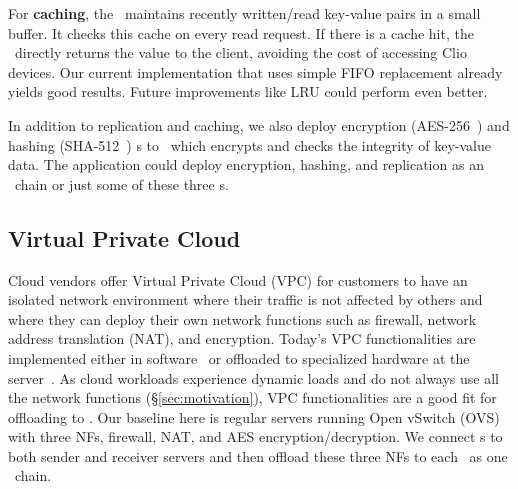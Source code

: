 For \textbf{caching}, the \snic\ maintains recently written/read key-value pairs in a small buffer. It checks this cache on every read request. If there is a cache hit, the \snic\ directly returns the value to the client, avoiding the cost of accessing Clio devices. Our current implementation that uses simple FIFO replacement already yields good results. Future improvements like LRU could perform even better.

In addition to replication and caching, we also deploy encryption (AES-256~\cite{aes-wiki}) and hashing (SHA-512~\cite{sha-wiki}) \nt{}s to \snic\ which encrypts and checks the integrity of key-value data.
The application could deploy encryption, hashing, and replication as an \nt\ chain or just some of these three \nt{}s.
\fi

\subsection{Virtual Private Cloud}
\label{sec:vpc}

Cloud vendors offer Virtual Private Cloud (VPC) for customers to have an isolated network environment where their traffic is not affected by others and where they can deploy their own network functions such as firewall, network address translation (NAT), and encryption.
Today's VPC functionalities are implemented either in software~\cite{andromeda-google-nsdi18,ovs-nsdi15,ovs-sigcomm21} or offloaded to specialized hardware at the server~\cite{vfp-nsdi17,SmartNIC-nsdi18,aws-nitro}.
As cloud workloads experience dynamic loads and do not always use all the network functions (\S\ref{sec:motivation}), VPC functionalities are a good fit for offloading to \snic.
Our baseline here is regular servers running Open vSwitch (OVS) with three NFs, firewall, NAT, and AES encryption/decryption. %
We connect \snic{}s to both sender and receiver servers and then offload these three NFs to each \snic\ as one \nt\ chain. 

